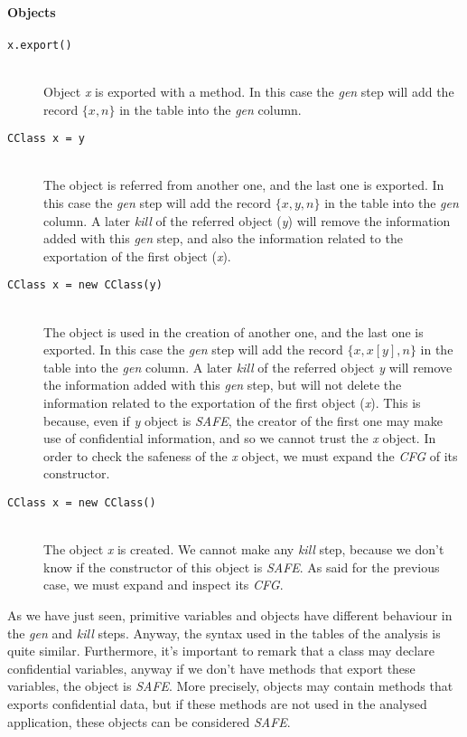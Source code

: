 \documentclass[letterpaper,twocolumn,10pt]{article}
\begin{document}
\noindent \paragraph{Objects}
\begin{description}
\item[\texttt{x.export()}] \hfill \\
Object \emph{x} is exported with a method. In this case the \emph{gen} step will add the record $\{x, n\}$ in the table into the \emph{gen} column.

\item[\texttt{CClass x = y}] \hfill \\
The object is referred from another one, and the last one is exported. In this case the \emph{gen} step will add the record $\{x, y, n\}$ in the table into the \emph{gen} column. A later \emph{kill} of the referred object (\emph{y}) will remove the information added with this \emph{gen} step, and also the information related to the exportation of the first object (\emph{x}).

\item[\texttt{CClass x = new CClass(y)}] \hfill \\
The object is used in the creation of another one, and the last one is exported. In this case the \emph{gen} step will add the record $\{x, x[y], n\}$ in the table into the \emph{gen} column. A later \emph{kill} of the referred object \emph{y} will remove the information added with this \emph{gen} step, but will not delete the information related to the exportation of the first object (\emph{x}). This is because, even if \emph{y} object is \emph{SAFE}, the creator of the first one may make use of confidential information, and so we cannot trust the \emph{x} object. In order to check the safeness of the \emph{x} object, we must expand the \emph{CFG} of its constructor.

\item[\texttt{CClass x = new CClass()}] \hfill \\
The object \emph{x} is created. We cannot make any \emph{kill} step, because we don't know if the constructor of this object is \emph{SAFE}. As said for the previous case, we must expand and inspect its \emph{CFG}.
\end{description}

As we have just seen, primitive variables and objects have different behaviour in the \emph{gen} and \emph{kill} steps. Anyway, the syntax used in the tables of the analysis is quite similar. Furthermore, it's important to remark that a class may declare confidential variables, anyway if we don't have methods that export these variables, the object is \emph{SAFE}. More precisely, objects may contain methods that exports confidential data, but if these methods are not used in the analysed application, these objects can be considered \emph{SAFE}. 
\end{document}
